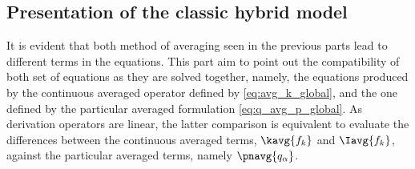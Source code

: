 \subsection{Presentation of the classic hybrid model}

It is evident that both method of averaging seen in the previous parts lead to different terms in the equations. 
This part aim to point out the compatibility of both set of equations as they are solved together, namely, the equations produced by the continuous averaged operator defined by \ref{eq:avg_k_global}, and the one defined by the particular averaged formulation \ref{eq:q_avg_p_global}. 
As derivation operators are linear, the latter comparison is equivalent to evaluate the differences between the continuous averaged terms, $\kavg{f_k}$ and $\Iavg{f_k}$, against the particular averaged terms, namely $\pnavg{q_\alpha}$.

